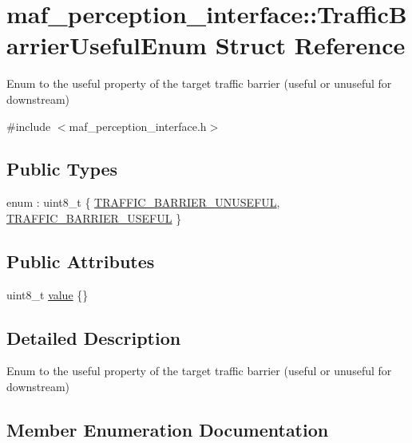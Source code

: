 \hypertarget{structmaf__perception__interface_1_1TrafficBarrierUsefulEnum}{}\section{maf\+\_\+perception\+\_\+interface\+:\+:Traffic\+Barrier\+Useful\+Enum Struct Reference}
\label{structmaf__perception__interface_1_1TrafficBarrierUsefulEnum}


Enum to the useful property of the target traffic barrier (useful or unuseful for downstream)  




{\ttfamily \#include $<$maf\+\_\+perception\+\_\+interface.\+h$>$}

\subsection*{Public Types}
\begin{DoxyCompactItemize}
\item 
enum \+: uint8\+\_\+t \{ \hyperlink{structmaf__perception__interface_1_1TrafficBarrierUsefulEnum_ae0eecd36f2676edfc8a6f3a93b32b427a50f4864d0db690745dea3c834790fcde}{T\+R\+A\+F\+F\+I\+C\+\_\+\+B\+A\+R\+R\+I\+E\+R\+\_\+\+U\+N\+U\+S\+E\+F\+UL}, 
\hyperlink{structmaf__perception__interface_1_1TrafficBarrierUsefulEnum_ae0eecd36f2676edfc8a6f3a93b32b427a811ff89a2ec41c9a4f6a1eb741398cd1}{T\+R\+A\+F\+F\+I\+C\+\_\+\+B\+A\+R\+R\+I\+E\+R\+\_\+\+U\+S\+E\+F\+UL}
 \}
\end{DoxyCompactItemize}
\subsection*{Public Attributes}
\begin{DoxyCompactItemize}
\item 
uint8\+\_\+t \hyperlink{structmaf__perception__interface_1_1TrafficBarrierUsefulEnum_a589dc65dd15e81bbfa7833ea868059d9}{value} \{\}
\end{DoxyCompactItemize}


\subsection{Detailed Description}
Enum to the useful property of the target traffic barrier (useful or unuseful for downstream) 

\subsection{Member Enumeration Documentation}
\mbox{\label{structmaf__perception__interface_1_1TrafficBarrierUsefulEnum_ae0eecd36f2676edfc8a6f3a93b32b427}} 
